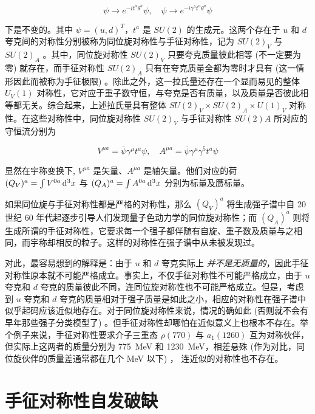 \begin{equation}
    \psi \to e^{-i t^a \theta^a} \psi, \quad \psi \to e^{-i \gamma^5 t^a \theta^a} \psi
\end{equation}

\noindent 下是不变的。其中 $\psi=(u, d)^T$，$t^a$ 是 $SU(2)$ 的生成元。这两个存在于 $u$ 和 $d$ 夸克间的对称性分别被称为同位旋对称性与手征对称性，记为 $SU(2)_V$ 与 $SU(2)_A$ 。其中，同位旋对称性 $SU(2)_V$ 只要夸克质量彼此相等 (不一定要为零) 就存在，而手征对称性 $SU(2)_A$ 只有在夸克质量全都为零时才具有 (这一情形因此而被称为手征极限) 。除此之外，这一拉氏量还存在一个显而易见的整体 $U_V(1)$ 对称性，它对应于重子数守恒，与夸克是否有质量，以及质量是否彼此相等都无关。综合起来，上述拉氏量具有整体 $SU(2)_V \times SU(2)_A \times U(1)_V$ 对称性。在这些对称性中，同位旋对称性 $SU(2)_V$ 与手征对称性 $SU(2)A$ 所对应的守恒流分别为

\begin{equation}
    V^{\mu a} = \overline{\psi} \gamma^\mu t^a \psi, \quad A^{\mu a} = \overline{\psi} \gamma^\mu \gamma^5 t^a \psi
\end{equation}

\noindent 显然在宇称变换下, $V^{\mu a}$ 是矢量、$A^{\mu a}$ 是轴矢量。他们对应的荷 $(Q_V)^a=\int V^{0a} \mathop{}\!\mathrm{d}^3 x$ 与 $(Q_A)^a=\int A^{0a} \mathop{}\!\mathrm{d}^3 x$ 分别为标量及赝标量。

如果同位旋与手征对称性都是严格的对称性，那么 $(Q_V)^a$ 将生成强子谱中自 20 世纪 60 年代起逐步引导人们发现量子色动力学的同位旋对称性；而 $(Q_A)^a$ 则将生成所谓的手征对称性，它要求每一个强子都伴随有自旋、重子数及质量与之相同，而宇称却相反的粒子。这样的对称性在强子谱中从未被发现过。

对此，最容易想到的解释是：由于 $u$ 和 $d$ 夸克实际上 \emph{并不是无质量的}，因此手征对称性原本就不可能严格成立。事实上，不仅手征对称性不可能严格成立，由于 $u$ 夸克和 $d$ 夸克的质量彼此不同，连同位旋对称性也不可能严格成立。但是，考虑到 $u$ 夸克和 $d$ 夸克的质量相对于强子质量是如此之小，相应的对称性在强子谱中似乎起码应该近似地存在。对于同位旋对称性来说，情况的确如此 (否则就不会有早年那些强子分类模型了) 。但手征对称性却哪怕在近似意义上也根本不存在。举个例子来说，手征对称性要求介子三重态 $\rho(770)$ 与 $a_1(1260)$ 互为对称伙伴，但实际上这两者的质量分别为 \qty{775}{MeV} 和 \qty{1230}{MeV}，相差悬殊 (作为对比，同位旋伙伴的质量差通常都在几个 \unit{MeV} 以下) ， 连近似的对称性也不存在。

\section{手征对称性自发破缺}


